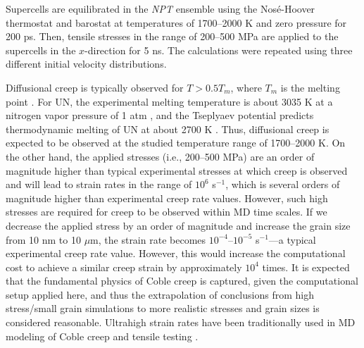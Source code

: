 \documentclass[preprint,12pt,sort&compress]{elsarticle}
\newcommand{\?}{\stackrel{?}{=}}
\begin{document}
Supercells are equilibrated in the \textit{NPT} ensemble using the Nosé-Hoover thermostat and barostat at temperatures of 1700--2000 K and zero pressure for 200 ps. Then, tensile stresses in the range of 200--500 MPa are applied to the supercells in the $x$-direction for 5 ns. The calculations were repeated using three different initial velocity distributions.

Diffusional creep is typically observed for $T > 0.5 T_m$, where $T_m$ is the melting point \cite{Courtney2005}. For UN, the experimental melting temperature is about 3035 K at a nitrogen vapor pressure of 1 atm \cite{Hayes1990IV}, and the Tseplyaev potential predicts thermodynamic melting of UN at about 2700 K \cite{AbdulHameed2024}. Thus, diffusional creep is expected to be observed at the studied temperature range of 1700--2000 K. On the other hand, the applied stresses (i.e., 200--500 MPa) are an order of magnitude higher than typical experimental stresses at which creep is observed and will lead to strain rates in the range of $10^6$ s$^{-1}$, which is several orders of magnitude higher than experimental creep rate values. However, such high stresses are required for creep to be observed within MD time scales. If we decrease the applied stress by an order of magnitude and increase the grain size from 10 nm to 10 $\mu$m, the strain rate becomes $10^{-4}$--$10^{-5}$ s$^{-1}$---a typical experimental creep rate value. However, this would increase the computational cost to achieve a similar creep strain by approximately $10^4$ times. It is expected that the fundamental physics of Coble creep is captured, given the computational setup applied here, and thus the extrapolation of conclusions from high stress/small grain simulations to more realistic stresses and grain sizes is considered reasonable. Ultrahigh strain rates have been traditionally used in MD modeling of Coble creep and tensile testing \cite{Keblinski1998,Yamakov2002,Desai2008,Haslam2004,AbdulHameed2024b}.
\end{document}

